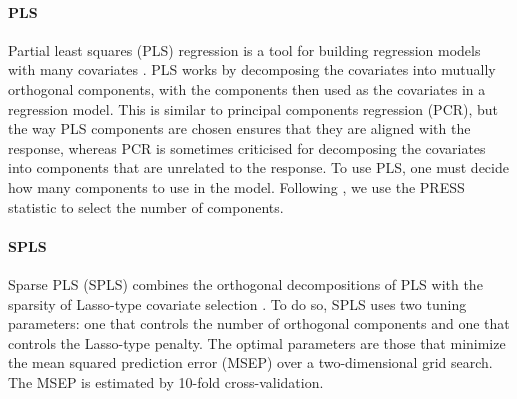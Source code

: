 \documentclass[authoryear,review, 12pt]{elsarticle}
\begin{document}
\paragraph{PLS}\label{pls}

Partial least squares (PLS) regression is a tool for building regression
models with many covariates \citep{Wold-Sjostrum-Eriksson-2001}. PLS
works by decomposing the covariates into mutually orthogonal components,
with the components then used as the covariates in a regression model.
This is similar to principal components regression (PCR), but the way
PLS components are chosen ensures that they are aligned with the
response, whereas PCR is sometimes criticised for decomposing the
covariates into components that are unrelated to the response. To use
PLS, one must decide how many components to use in the model. Following
\citep{Brooks-Fienen-Corsi-2013}, we use the PRESS statistic to select
the number of components.

\paragraph{SPLS}\label{spls}

Sparse PLS (SPLS) combines the orthogonal decompositions of PLS with the
sparsity of Lasso-type covariate selection \citep{Chun-Keles-2010}. To do
so, SPLS uses two tuning parameters: one that controls the number of
orthogonal components and one that controls the Lasso-type penalty. The
optimal parameters are those that minimize the mean squared prediction
error (MSEP) over a two-dimensional grid search. The MSEP is estimated
by 10-fold cross-validation.
\end{document}

